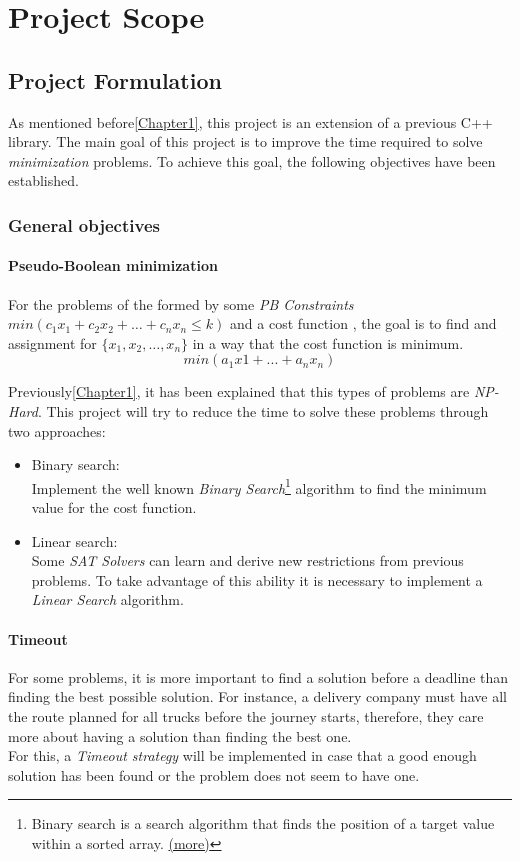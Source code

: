\chapter{Project Scope}
\label{Chapter2}

\section{Project Formulation}

As mentioned before\ref{Chapter1}, this project is an extension of a previous C++ library. The main goal of this project is to improve the time required to solve \emph{minimization} problems. To achieve this goal, the following objectives have been established. 

\subsection{General objectives}

\subsubsection{Pseudo-Boolean minimization}
For the problems of the formed by some \emph{PB Constraints} $min(c_{1}x_{1}+c_{2}x_{2}+\ldots +c_{n}x_{n} \leq k)$ and a cost function , the goal is to find and assignment for $\{x_{1},x_{2},\ldots,x_{n}\}$ in a way that the cost function is minimum. $$min(a_{1}x{1} + ... + a_{n}x_{n})$$

Previously\ref{Chapter1}, it has been explained that this types of problems are \emph{NP-Hard}. This project will try to reduce the time to solve these problems through two approaches:
\begin{itemize}
	\item Binary search:\\
	Implement the well known \emph{Binary Search}\footnote{Binary search is a search algorithm that finds the position of a target value within a sorted array. \href{https://en.wikipedia.org/wiki/Binary_search_algorithm}{(more)}} algorithm to find the minimum value for the cost function.	
	\item Linear search:\\
	Some \emph{SAT Solvers} can learn and derive new restrictions from previous problems. To take advantage of this ability it is necessary to implement a \emph{Linear Search} algorithm.
\end{itemize}

\subsubsection{Timeout}
For some problems, it is more important to find a solution before a deadline than finding the best possible solution. For instance, a delivery company must have all the route planned for all trucks before the journey starts, therefore, they care more about having a solution than finding the best one.\\
For this, a \emph{Timeout strategy} will be implemented in case that a good enough solution has been found or the problem does not seem to have one. 
